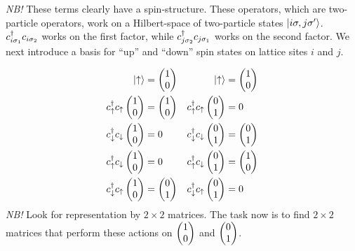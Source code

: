 \emph{NB!} These terms clearly have a spin-structure. These operators, which are two-particle operators, work on a Hilbert-space of two-particle states $\ket{i\sigma,j\sigma'}$.
$\cd_{i\sigma_1}c_{i\sigma_2}$ works on the first factor, while $\cd_{j\sigma_2}c_{j\sigma_1}$ works on the second factor. 
We next introduce a basis for ``up'' and ``down'' spin states on lattice sites $i$ and $j$.

\begin{align*}
	\ket{\uparrow} &= \upm & \ket{\uparrow} &= \upm \\
\cd_{\uparrow}c_{\uparrow}\upm &= \upm & \cd_{\uparrow}c_{\uparrow}\downm &=0 \\
\cd_{\downarrow}c_{\downarrow}\upm &= 0 & \cd_{\downarrow}c_{\downarrow}\downm &= \downm \\
\cd_{\uparrow}c_{\downarrow}\upm &= 0 & \cd_{\uparrow}c_{\downarrow}\downm &= \upm \\
\cd_{\downarrow}c_{\uparrow}\upm &= \downm & \cd_{\downarrow}c_{\uparrow}\downm &= 0 
\end{align*}
\emph{NB!} Look for representation by $2\times2$ matrices. The task now is to find $2\times2$ matrices that perform these actions on $\upm$ and $\downm$.

